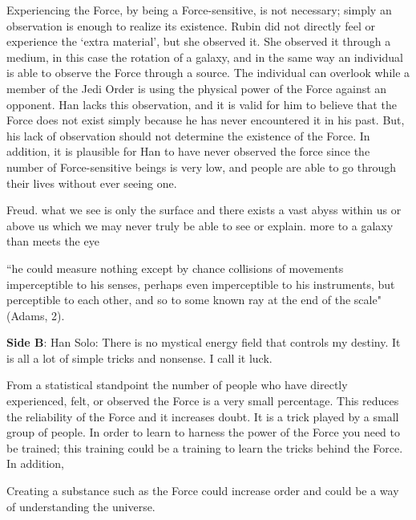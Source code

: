 \documentclass[11pt, oneside]{article}
\begin{document}
\par Experiencing the Force, by being a Force-sensitive, is not necessary; simply an observation is enough to realize its existence. Rubin did not directly feel or experience the `extra material', but she observed it. She observed it through a medium, in this case the rotation of a galaxy, and in the same way an individual is able to observe the Force through a source. The individual can overlook while a member of the Jedi Order is using the physical power of the Force against an opponent. Han lacks this observation, and it is valid for him to believe that the Force does not exist simply because he has never encountered it in his past. But, his lack of observation should not determine the existence of the Force. In addition, it is plausible for Han to have never observed the force since the number of Force-sensitive beings is very low, and people are able to go through their lives without ever seeing one. 

\par 

\par Freud. what we see is only the surface and there exists a vast abyss within us or above us which we may never truly be able to see or explain. more to a galaxy than meets the eye

\par ``he could measure nothing except by chance collisions of movements imperceptible to his senses, perhaps even imperceptible to his instruments, but perceptible to each other, and so to some known ray at the end of the scale" (Adams, 2).

\newpage 

\noindent \textbf{Side B}: Han Solo: There is no mystical energy field that controls my destiny.  It is all a lot of simple tricks and nonsense. I call it luck. 

\par From a statistical standpoint the number of people who have directly experienced, felt, or observed the Force is a very small percentage. This reduces the reliability of the Force and it increases doubt. It is a trick played by a small group of people. In order to learn to harness the power of the Force you need to be trained; this training could be a training to learn the tricks behind the Force. In addition,

\par Creating a substance such as the Force could increase order and could be a way of understanding the universe.
\end{document}
